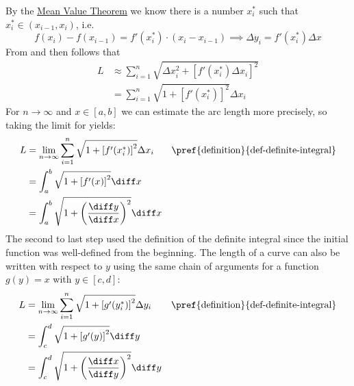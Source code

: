 \begin{flushleft}
	By the \hyperref[thm-mean-value-theorem]{Mean Value Theorem} we know there
	is a number $x_i^*$ such that $x_i^*\in(x_{i-1},x_i)$, i.e.
	\begin{equation}
		f(x_i)-f(x_{i-1}) = f'(x_i^*)\cdot(x_i-x_{i-1})
		\implies
		\Delta y_i=f'(x_i^*)\Delta x\label{eq-arc-length-tmp:2}
	\end{equation}
	From  and 
	then follows that
	\begin{align}
		L & \approx\sum_{i=1}^n \sqrt{\Delta x_i^2 + \left[f'(x_i^*)\Delta x_i\right]^2}\nonumber \\
		  & = \sum_{i=1}^n \sqrt{1+\left[f'(x_i^*)\right]^2}\Delta x_i\label{eq-arc-length-tmp:3}
	\end{align}
	For $n\rightarrow\infty$ and $x\in[a,b]$ we can estimate the arc length more
	precisely, so taking the limit for  yields:
	\begin{align}
		L & =\lim_{n\rightarrow\infty}\sum_{i=1}^n \sqrt{1+\left[f'(x_i^*)\right]^2}\Delta x_i      &  & \text{\pref{definition}{def-definite-integral}} \nonumber \\
		  & =\int_a^b \sqrt{1+\left[f'(x)\right]^2}\diff x\nonumber                                                                                                \\
		  & =\int_a^b \sqrt{1+\left(\frac{\diff y}{\diff x}\right)^2}\diff x\label{eq-arc-length-x}
	\end{align}
	The second to last step used the definition of the definite integral since
	the initial function was well-defined from the beginning. The length of a
	curve can also be written with respect to $y$ using the same chain of
	arguments for a function $g(y)=x$ with $y\in[c,d]$:
	\begin{align}
		L & =\lim_{n\rightarrow\infty}\sum_{i=1}^n \sqrt{1+\left[g'(y_i^*)\right]^2}\Delta y_i      &  & \text{\pref{definition}{def-definite-integral}}\nonumber \\
		  & =\int_c^d \sqrt{1+\left[g'(y)\right]^2}\diff y\nonumber                                                                                               \\
		  & =\int_c^d \sqrt{1+\left(\frac{\diff x}{\diff y}\right)^2}\diff y\label{eq-arc-length-y}
	\end{align}
\end{flushleft}

